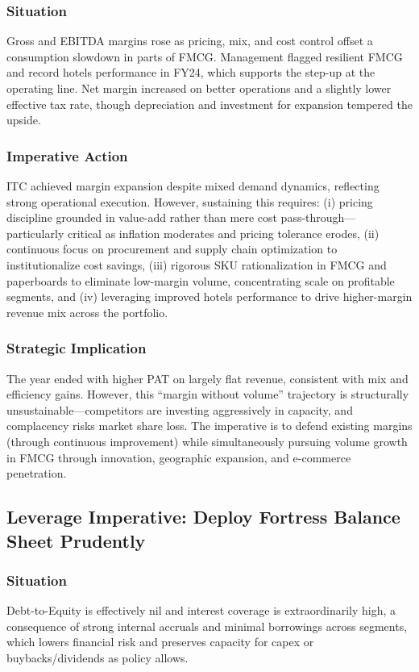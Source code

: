 \documentclass[12pt, a4paper]{report}
\begin{document}
\subsubsection{Situation}
Gross and EBITDA margins rose as pricing, mix, and cost control offset a consumption slowdown in parts of FMCG. Management flagged resilient FMCG and record hotels performance in FY24, which supports the step-up at the operating line. Net margin increased on better operations and a slightly lower effective tax rate, though depreciation and investment for expansion tempered the upside.

\subsubsection{Imperative Action}
ITC achieved margin expansion despite mixed demand dynamics, reflecting strong operational execution. However, sustaining this requires: (i) pricing discipline grounded in value-add rather than mere cost pass-through—particularly critical as inflation moderates and pricing tolerance erodes, (ii) continuous focus on procurement and supply chain optimization to institutionalize cost savings, (iii) rigorous SKU rationalization in FMCG and paperboards to eliminate low-margin volume, concentrating scale on profitable segments, and (iv) leveraging improved hotels performance to drive higher-margin revenue mix across the portfolio.

\subsubsection{Strategic Implication}
The year ended with higher PAT on largely flat revenue, consistent with mix and efficiency gains. However, this ``margin without volume'' trajectory is structurally unsustainable—competitors are investing aggressively in capacity, and complacency risks market share loss. The imperative is to defend existing margins (through continuous improvement) while simultaneously pursuing volume growth in FMCG through innovation, geographic expansion, and e-commerce penetration.

\subsection{Leverage Imperative: Deploy Fortress Balance Sheet Prudently}

\subsubsection{Situation}
Debt-to-Equity is effectively nil and interest coverage is extraordinarily high, a consequence of strong internal accruals and minimal borrowings across segments, which lowers financial risk and preserves capacity for capex or buybacks/dividends as policy allows.
\end{document}
